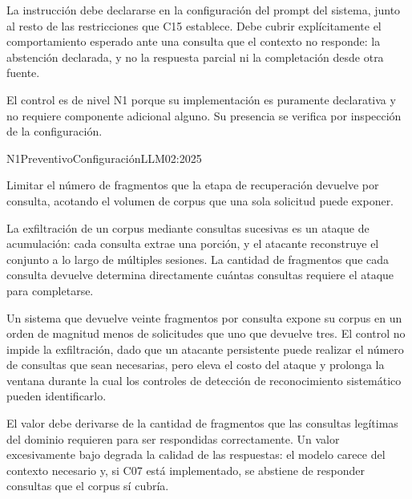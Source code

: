 La instrucción debe declararse en la configuración del prompt del sistema, junto al resto de las restricciones que C15 establece. Debe cubrir explícitamente el comportamiento esperado ante una consulta que el contexto no responde: la abstención declarada, y no la respuesta parcial ni la completación desde otra fuente.

El control es de nivel N1 porque su implementación es puramente declarativa y no requiere componente adicional alguno. Su presencia se verifica por inspección de la configuración.


  {N1}{Preventivo}{Configuración}{LLM02:2025}

Limitar el número de fragmentos que la etapa de recuperación devuelve por consulta, acotando el volumen de corpus que una sola solicitud puede exponer.

La exfiltración de un corpus mediante consultas sucesivas es un ataque de acumulación: cada consulta extrae una porción, y el atacante reconstruye el conjunto a lo largo de múltiples sesiones. La cantidad de fragmentos que cada consulta devuelve determina directamente cuántas consultas requiere el ataque para completarse.

Un sistema que devuelve veinte fragmentos por consulta expone su corpus en un orden de magnitud menos de solicitudes que uno que devuelve tres. El control no impide la exfiltración, dado que un atacante persistente puede realizar el número de consultas que sean necesarias, pero eleva el costo del ataque y prolonga la ventana durante la cual los controles de detección de reconocimiento sistemático pueden identificarlo.

El valor debe derivarse de la cantidad de fragmentos que las consultas legítimas del dominio requieren para ser respondidas correctamente. Un valor excesivamente bajo degrada la calidad de las respuestas: el modelo carece del contexto necesario y, si C07 está implementado, se abstiene de responder consultas que el corpus sí cubría.


